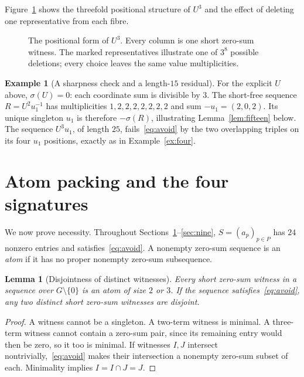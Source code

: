 \documentclass[11pt]{article}
\newtheorem{lemma}[theorem]{Lemma}
\theoremstyle{definition}
\newtheorem{example}[theorem]{Example}
\theoremstyle{remark}
\newcommand{\sig}{\sigma}
\begin{document}
Figure~\ref{fig:fibres} shows the threefold positional structure of
$U^3$ and the effect of deleting one representative from each fibre.

\begin{figure}[htbp]
\centering
{}
\caption{The positional form of $U^3$. Every column is one short zero-sum
witness. The marked representatives illustrate one of $3^8$ possible
deletions; every choice leaves the same value multiplicities.}
\label{fig:fibres}
\end{figure}

\begin{example}[A sharpness check and a length-$15$ residual]\label{ex:residual}
For the explicit $U$ above, $\sig(U)=0$: each coordinate sum is divisible
by $3$. The short-free sequence $R=U^2u_1^{-1}$ has multiplicities
$1,2,2,2,2,2,2,2$ and sum $-u_1=(2,0,2)$.
Its unique singleton $u_1$ is therefore $-\sig(R)$, illustrating
Lemma~\ref{lem:fifteen} below. The sequence $U^3u_1$, of length $25$,
fails~\eqref{eq:avoid} by the two overlapping triples on its four $u_1$
positions, exactly as in Example~\ref{ex:four}.
\end{example}
\FloatBarrier

\section{Atom packing and the four signatures}\label{sec:packing}
We now prove necessity. Throughout Sections~\ref{sec:packing}--\ref{sec:nine},
$S=(a_p)_{p\in P}$ has $24$ nonzero entries and satisfies~\eqref{eq:avoid}.
A nonempty zero-sum sequence is an \emph{atom} if it has no proper nonempty
zero-sum subsequence.

\begin{lemma}[Disjointness of distinct witnesses]\label{lem:disjoint}
Every short zero-sum witness in a sequence over $G\setminus\{0\}$ is
an atom of size $2$ or $3$. If the sequence satisfies~\eqref{eq:avoid},
any two distinct short zero-sum witnesses are disjoint.
\end{lemma}
\begin{proof}
A witness cannot be a singleton. A two-term witness is minimal.
A three-term witness cannot contain a zero-sum pair, since its remaining
entry would then be zero, so it too is minimal.
If witnesses $I,J$ intersect nontrivially,~\eqref{eq:avoid} makes their
intersection a nonempty zero-sum subset of each. Minimality implies
$I=I\cap J=J$.
\end{proof}
\end{document}
